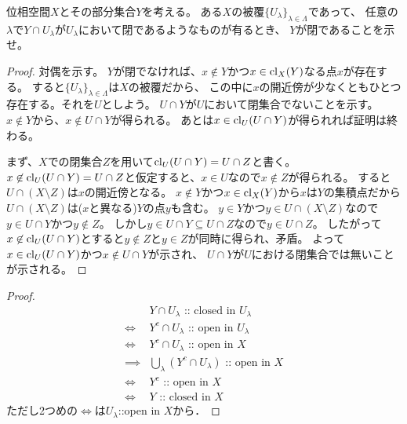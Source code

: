 \documentclass{jarticle}
\begin{document}
    \begin{Prop}
        位相空間$X$とその部分集合$Y$を考える。
        ある$X$の被覆$\{ U_{\lambda} \}_{\lambda \in \Lambda}$であって、
        任意の$\lambda$で$Y \cap U_{\lambda}$が$U_{\lambda}$において閉であるようなものが有るとき、
        $Y$が閉であることを示せ。
    \end{Prop}

    \begin{proof}
    対偶を示す。
    $Y$が閉でなければ、$x \not \in Y$かつ$x \in \operatorname{cl}_{X}(Y)$なる点$x$が存在する。
    すると$\{ U_{\lambda} \}_{\lambda \in \Lambda}$は$X$の被覆だから、
    この中に$x$の開近傍が少なくともひとつ存在する。それを$U$としよう。
    $U \cap Y$が$U$において閉集合でないことを示す。
    $x \not \in Y$から、$x \not \in U \cap Y$が得られる。
    あとは$x \in \operatorname{cl}_{U}(U \cap Y)$が得られれば証明は終わる。

    まず、$X$での閉集合$Z$を用いて$\operatorname{cl}_{U}(U \cap Y)=U \cap Z$と書く。
    $x \not \in \operatorname{cl}_{U}(U \cap Y)=U \cap Z$と仮定すると、$x \in U$なので$x \not \in Z$が得られる。
    すると$U \cap (X \setminus Z)$は$x$の開近傍となる。
    $x \not \in Y$かつ$x \in \operatorname{cl}_{X}(Y)$から$x$は$Y$の集積点だから$U \cap (X \setminus Z)$は($x$と異なる)$Y$の点$y$も含む。
    $y \in Y$かつ$y \in U \cap (X \setminus Z)$なので$y \in U \cap Y$かつ$y \not \in Z$。
    しかし$y \in U \cap Y \subseteq U \cap Z$なので$y \in U \cap Z$。
    したがって$x \not \in \operatorname{cl}_{U}(U \cap Y)$とすると$y \not \in Z$と$y \in Z$が同時に得られ、矛盾。
    よって$x \in \operatorname{cl}_{U}(U \cap Y)$かつ$x \not \in U \cap Y$が示され、
    $U \cap Y$が$U$における閉集合では無いことが示される。
    \end{proof}
    \begin{proof}
        \begin{align*}
            {}&         Y \cap U_{\lambda} \text{ :: closed in } U_{\lambda} \\
            \iff&       Y^c \cap U_{\lambda} \text{ :: open in } U_{\lambda} \\ 
            \iff&       Y^c \cap U_{\lambda} \text{ :: open in } X \\ 
            \implies&   {\textstyle \bigcup_{\lambda}{(Y^c \cap U_{\lambda})}} \text{ :: open in } X \\ 
            \iff&       Y^c \text{ :: open in } X \\ 
            \iff&       Y \text{ :: closed in } X
        \end{align*}
        ただし2つめの$\iff$は$U_{\lambda}$::open in $X$から．
    \end{proof}
\end{document}
